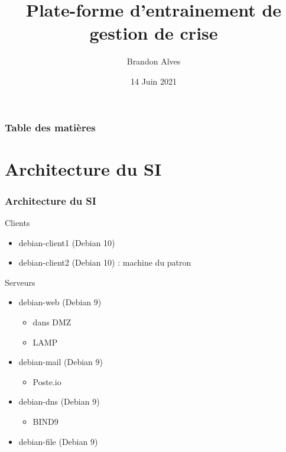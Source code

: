 \documentclass{beamer}
\title[Audit]{Plate-forme d'entrainement de gestion de crise}
\author{Brandon Alves}
\institute[INSA Lyon]{
	INSA Lyon \\
	\medskip
	INRIA
}
\date{14 Juin 2021}
\begin{document}
	\begin{frame}
		\titlepage
	\end{frame}
	\begin{frame}
		\frametitle{Table des matières}
		\tableofcontents
	\end{frame}
	\section{Architecture du SI}
		\begin{frame}
			\frametitle{Architecture du SI}
			\begin{block}{Clients}
				\begin{itemize}
					\item debian-client1 (Debian 10)
					\item debian-client2 (Debian 10) : machine du patron
				\end{itemize}
			\end{block}
			\begin{block}{Serveurs}
				\begin{itemize}
					\item debian-web (Debian 9)
					\begin{itemize}
						\item dans DMZ
						\item LAMP
					\end{itemize}
					\item debian-mail (Debian 9)
					\begin{itemize}
						\item Poste.io
					\end{itemize}
					\item debian-dns (Debian 9)
					\begin{itemize}
						\item BIND9
					\end{itemize}
					\item debian-file (Debian 9)
				\end{itemize}
			\end{block}
		\end{frame}
\end{document}
